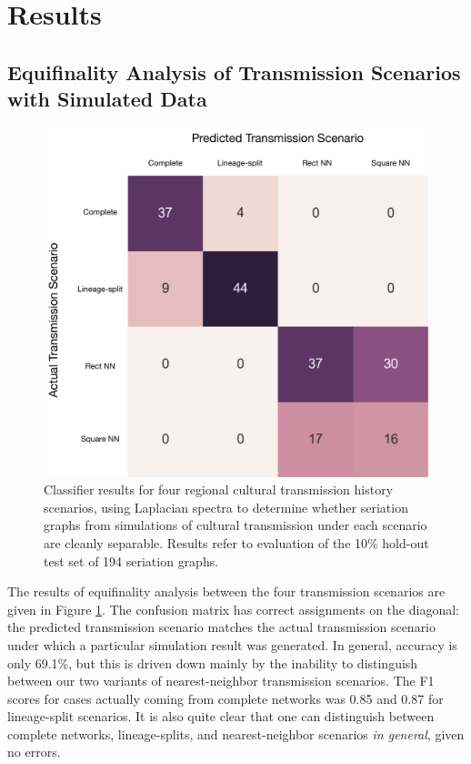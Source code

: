     \section{Results}\label{metapop:sec:results}
    
    
    
    \subsection{Equifinality Analysis of Transmission Scenarios with Simulated Data}\label{metapop:sec:results-simulation}
    
    \begin{figure}[ht]
    \centering
    \includegraphics[scale=0.40]{graphics/multipleseriation/metapop-confusion-matrix.pdf}
    \caption{Classifier results for four regional cultural transmission history scenarios, using Laplacian spectra to determine whether seriation graphs from simulations of cultural transmission under each scenario are cleanly separable.  Results refer to evaluation of the 10\% hold-out test set of 194 seriation graphs.}
    \label{metapop:fig:confusion-matrix-testset}
    \end{figure}
    
    The results of equifinality analysis between the four transmission scenarios are given in Figure \ref{metapop:fig:confusion-matrix-testset}.  The confusion matrix has correct assignments on the diagonal:  the predicted transmission scenario matches the actual transmission scenario under which a particular simulation result was generated.  In general, accuracy is only 69.1\%, but this is driven down mainly by the inability to distinguish between our two variants of nearest-neighbor transmission scenarios.  The F1 scores for cases actually coming from complete networks was 0.85 and 0.87 for lineage-split scenarios.  It is also quite clear that one can distinguish between complete networks, lineage-splits, and nearest-neighbor scenarios \emph{in general}, given no errors. 
    
